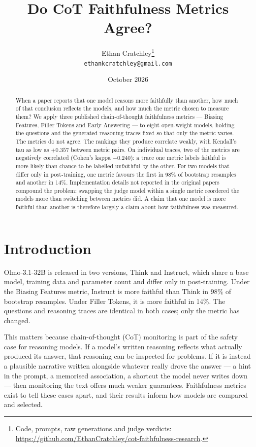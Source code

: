 \documentclass[11pt]{article}
\title{\LARGE\bf Do CoT Faithfulness Metrics Agree?}
\author{Ethan Cratchley\thanks{Code, prompts, raw generations and judge verdicts:
  \url{https://github.com/EthanCratchley/cot-faithfulness-research}.} \\
  \normalsize\texttt{ethankcratchley@gmail.com}}
\date{October 2026}
\begin{document}
\maketitle

\begin{abstract}
\noindent When a paper reports that one model reasons more faithfully than another, how much of
that conclusion reflects the models, and how much the metric chosen to measure them? We apply
three published chain-of-thought faithfulness metrics --- Biasing Features, Filler Tokens and
Early Answering --- to eight open-weight models, holding the questions and the generated
reasoning traces fixed so that only the metric varies. The metrics do not agree. The rankings
they produce correlate weakly, with Kendall's tau as low as $+0.357$ between metric pairs. On
individual traces, two of the metrics are negatively correlated (Cohen's kappa $-0.240$): a
trace one metric labels faithful is more likely than chance to be labelled unfaithful by the
other. For two models that differ only in post-training, one metric favours the first in 98\%
of bootstrap resamples and another in 14\%. Implementation details not reported in the original
papers compound the problem: swapping the judge model within a single metric reordered the
models more than switching between metrics did. A claim that one model is more faithful than
another is therefore largely a claim about how faithfulness was measured.
\end{abstract}

\section{Introduction}

Olmo-3.1-32B is released in two versions, Think and Instruct, which share a base model,
training data and parameter count and differ only in post-training. Under the Biasing Features
metric, Instruct is more faithful than Think in 98\% of bootstrap resamples. Under Filler
Tokens, it is more faithful in 14\%. The questions and reasoning traces are identical in both
cases; only the metric has changed.

This matters because chain-of-thought (CoT) monitoring is part of the safety case for reasoning
models. If a model's written reasoning reflects what actually produced its answer, that
reasoning can be inspected for problems. If it is instead a plausible narrative written
alongside whatever really drove the answer --- a hint in the prompt, a memorised association, a
shortcut the model never writes down --- then monitoring the text offers much weaker guarantees.
Faithfulness metrics exist to tell these cases apart, and their results inform how models are
compared and selected.
\end{document}
